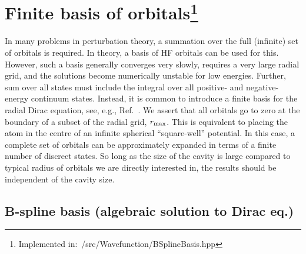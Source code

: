 \documentclass[10pt,twocolumn,a4paper]{article}%
\begin{document}
\section[Finite basis of orbitals]{Finite basis of orbitals\label{sec:finite-basis}\footnote{Implemented in:~/src/Wavefunction/BSplineBasis.hpp}}

In many problems in perturbation theory, a summation over the full (infinite) set of orbitals is required.
In theory, a basis of HF orbitals can be used for this.
However, such a basis generally converges very slowly, requires a very large radial grid, and the solutions become numerically unstable for low energies.
Further, sum over all states must include the integral over all positive- and negative-energy continuum states.
%
Instead, it is common to introduce a finite basis for the radial Dirac equation, see, e.g., Ref.~\cite{Quiney1987,Johnson1988}.
%
We assert that all orbitals go to zero at the boundary of a subset of the radial grid, $r_{\rm max}$.
This is equivalent to placing the atom in the centre of an infinite spherical ``square-well'' potential.
In this case, a complete set of orbitals can be approximately expanded in terms of a finite number of discreet states.
So long as the size of the cavity is large compared to typical radius of orbitals we are directly interested in, the results should be independent of the cavity size.




\subsection{B-spline basis (algebraic solution to Dirac eq.)}\label{sec:Bsplines}
\end{document}
